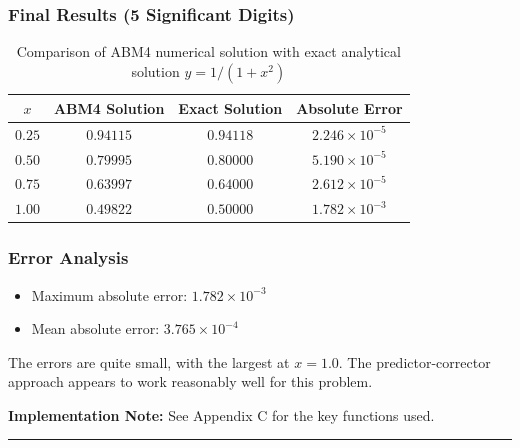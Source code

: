 \subsubsection*{Final Results (5 Significant Digits)}

\begin{table}[h]
\centering
\begin{tabular}{cccc}
\toprule
$x$ & ABM4 Solution & Exact Solution & Absolute Error \\
\midrule
$0.25$ & $0.94115$ & $0.94118$ & $2.246 \times 10^{-5}$ \\
$0.50$ & $0.79995$ & $0.80000$ & $5.190 \times 10^{-5}$ \\
$0.75$ & $0.63997$ & $0.64000$ & $2.612 \times 10^{-5}$ \\
$1.00$ & $0.49822$ & $0.50000$ & $1.782 \times 10^{-3}$ \\
\bottomrule
\end{tabular}
\caption{Comparison of ABM4 numerical solution with exact analytical solution $y = 1/(1+x^2)$}
\end{table}

\subsubsection*{Error Analysis}

\begin{itemize}
    \item Maximum absolute error: $1.782 \times 10^{-3}$
    \item Mean absolute error: $3.765 \times 10^{-4}$
\end{itemize}

The errors are quite small, with the largest at $x = 1.0$. The predictor-corrector approach appears to work reasonably well for this problem.

\textbf{Implementation Note:} See Appendix C for the key functions used.

\vspace{2em}
\noindent\rule{\textwidth}{0.4pt}
